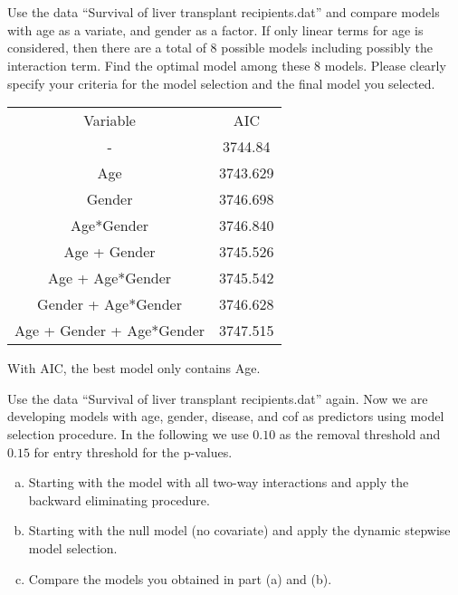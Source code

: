\documentclass{elegantbook}
\begin{document}
 

\setcounter{chapter}{6}
\chapter{}
\begin{exercise*}[1]
    Use the data “Survival of liver transplant recipients.dat” and compare models with age as a variate, and gender as a factor. If only linear terms for age is considered, then there are a total of 8 possible models including possibly the interaction term. Find the optimal model among these $8$ models. Please clearly specify your criteria for the model selection and the final model you selected.
\end{exercise*}

\begin{solution}
\begin{table}[h]
    \centering
    \begin{tabular}{cc}
    \hline
    Variable                   & AIC                             \\
    -                          & 3744.84                         \\
    {\color[HTML]{FE0000} Age} & {\color[HTML]{FE0000} 3743.629} \\
    Gender                     & 3746.698                        \\
    Age*Gender                 & 3746.840                        \\
    Age + Gender               & 3745.526                        \\
    Age + Age*Gender           & 3745.542                        \\
    Gender + Age*Gender        & 3746.628                        \\
    Age + Gender + Age*Gender  & 3747.515                        \\ \hline
    \end{tabular}
    \end{table}
    With AIC, the best model only contains Age. 
\end{solution}

\begin{exercise*}[2]
    Use the data “Survival of liver transplant recipients.dat” again. Now we are developing models with age, gender, disease, and cof as predictors using model selection procedure. In the following we use $0.10$ as the removal threshold and $0.15$ for entry threshold for the p-values.
    \begin{enumerate}[(a)]
        \item Starting with the model with all two-way interactions and apply the backward eliminating procedure. 
        \item Starting with the null model (no covariate) and apply the dynamic stepwise model selection. 
        \item Compare the models you obtained in part (a) and (b).
    \end{enumerate}
\end{exercise*}
\end{document}
